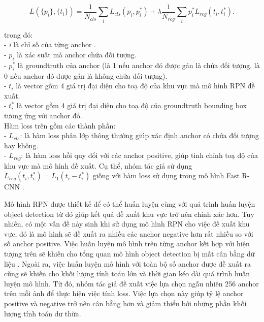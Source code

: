 {    \begin{equation}
        \label{eq:faster_rcnn_loss}
        L(\{p_i\}, \{t_i\}) = \frac{1}{N_{cls}}\sum_i L_{cls}(p_i, p^{*}_i) + \lambda\frac{1}{N_{reg}}\sum_i  p^{*}_i L_{reg}(t_i, t^{*}_i).
    \end{equation}

    \noindent
    trong đó: \\
    - \textit{i} là chỉ số của từng anchor . \\
    - \textit{$p_i$} là xác suất mà anchor  chứa đối tượng. \\
    - \textit{$p^{*}_i$} là groundtruth  của anchor  (là 1 nếu anchor  đó được gán là chứa đối tượng, là 0 nếu anchor  đó được gán là không chứa đối tượng). \\
    - \textit{$t_i$} là vector gồm 4 giá trị đại diện cho toạ độ của khu vực mà mô hình RPN đề xuất. \\
    - \textit{$t^{*}_i$} là vector gồm 4 giá trị đại diện cho toạ độ của groundtruth  bounding box  tương ứng với anchor  đó. \\
    Hàm loss trên gồm các thành phần: \\
    - \textit{$L_{cls}$}: là hàm loss phân lớp thông thường giúp xác định anchor  có chứa đối tượng hay không. \\
    - \textit{$L_{reg}$}: là hàm loss hồi quy đối với các anchor  positive, giúp tinh chỉnh toạ độ của khu vực mà mô hình đề xuất.
    Cụ thể, nhóm tác giả sử dụng $L_{reg}(t_i, t^{*}_i)=L_1(t_i - t^{*}_i)$ giống với hàm loss sử dụng trong mô hình Fast R-CNN \cite{girshick2015fast}.

    \noindent
    Mô hình RPN được thiết kế để có thể huấn luyện cùng với quá trình huấn luyện object detection từ đó giúp kết quả đề xuất khu vực trở nên chính xác hơn.
    Tuy nhiên, có một vấn đề nảy sinh khi sử dụng mô hình RPN cho việc đề xuất khu vực, đó là mô hình sẽ đề xuất ra nhiều các anchor  negative hơn rất nhiều so với số anchor  positive.
    Việc huấn luyện mô hình trên từng anchor  kết hợp với hiện tượng trên sẽ khiến cho tổng quan mô hình object detection bị mất cân bằng dữ liệu .
    Ngoài ra, việc huấn luyện mô hình với toàn bộ số anchor  được đề xuất ra cũng sẽ khiến cho khối lượng tính toán lớn và thời gian kéo dài quá trình huấn luyện mô hình.
    Từ đó, nhóm tác giả đề xuất việc lựa chọn ngẫu nhiên 256 anchor  trên mỗi ảnh để thực hiện việc tính loss. Việc lựa chọn này giúp tỷ lệ anchor  positive và negative trở nên cân bằng hơn và giảm thiểu bởi những phần khối lượng tính toán dư thừa.

}
